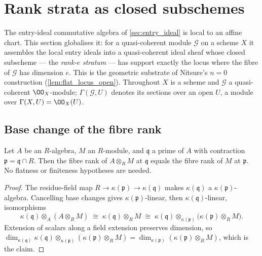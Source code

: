 \section{Rank strata as closed subschemes}
\label{sec:flatstrat_rank_stratum}

The entry-ideal commutative algebra of \cref{sec:entry_ideal} is local to an
affine chart.  This section globalises it: for a quasi-coherent module
\(\mathcal G\) on a scheme \(X\) it assembles the local entry ideals into a
quasi-coherent ideal sheaf whose closed subscheme --- the \emph{rank-\(e\)
stratum} --- has support exactly the locus where the fibre of \(\mathcal G\)
has dimension \(e\).  This is the geometric substrate of Nitsure's
\(n = 0\) construction (\cref{lem:flat_locus_open}).  Throughout \(X\) is a
scheme and \(\mathcal G\) a quasi-coherent \(\OO_X\)-module; \(\Gamma(\mathcal G, U)\)
denotes its sections over an open \(U\), a module over \(\Gamma(X, U) = \OO_X(U)\).

\subsection{Base change of the fibre rank}

\begin{theorem}
  \label{thm:fiber_rank_base_change}
  \leanok
  Let \(A\) be an \(R\)-algebra, \(M\) an \(R\)-module, and \(\mathfrak q\) a
  prime of \(A\) with contraction \(\mathfrak p = \mathfrak q \cap R\).  Then
  the fibre rank of \(A \otimes_R M\) at \(\mathfrak q\) equals the fibre rank
  of \(M\) at \(\mathfrak p\).  No flatness or finiteness hypotheses are
  needed.
\end{theorem}

\begin{proof}
  \leanok
  The residue-field map \(R \to \kappa(\mathfrak p) \to \kappa(\mathfrak q)\)
  makes \(\kappa(\mathfrak q)\) a \(\kappa(\mathfrak p)\)-algebra.  Cancelling
  base changes gives \(\kappa(\mathfrak p)\)-linear, then
  \(\kappa(\mathfrak q)\)-linear, isomorphisms
  \[
    \kappa(\mathfrak q) \otimes_A (A \otimes_R M)
      \;\cong\; \kappa(\mathfrak q) \otimes_R M
      \;\cong\; \kappa(\mathfrak q) \otimes_{\kappa(\mathfrak p)}
        \bigl(\kappa(\mathfrak p) \otimes_R M\bigr).
  \]
  Extension of scalars along a field extension preserves dimension, so
  \(\dim_{\kappa(\mathfrak q)}
    \kappa(\mathfrak q) \otimes_{\kappa(\mathfrak p)}
    (\kappa(\mathfrak p) \otimes_R M)
    = \dim_{\kappa(\mathfrak p)}(\kappa(\mathfrak p) \otimes_R M)\),
  which is the claim.
\end{proof}


